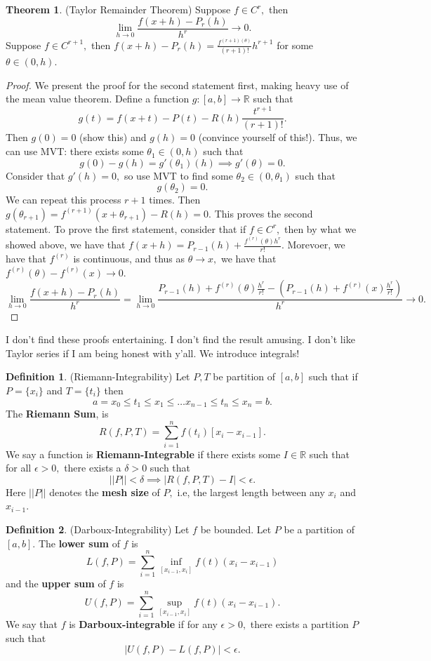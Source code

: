 \documentclass[10pt, oneside]{article}
\newcommand{\bbR}{\mathbb{R}}
\theoremstyle{definition}
\newtheorem{thm}{Theorem}
\newtheorem{defn}{Definition}
\begin{document}
\begin{thm}
    (Taylor Remainder Theorem) Suppose $f\in C^{r},$ then 
    \[\lim_{h\to 0}\frac{f(x + h) - P_r(h)}{h^r}\to 0.\] Suppose $f\in C^{r+1},$ then $f(x + h) - P_r(h) = \frac{f^{(r+1)(\theta)}}{(r+1)!}h^{r+1}$ for some $\theta \in (0,h).$
\end{thm}
\begin{proof}
    We present the proof for the second statement first, making heavy use of the mean value theorem. Define a function $g: [a,b]\to \bbR$ such that 
    \[g(t) = f(x + t) - P(t) - R(h)\frac{t^{r+1}}{(r+1)!}.\] Then $g(0) = 0$ (show this) and $g(h) = 0$ (convince yourself of this!). Thus, we can use MVT: there exists some $\theta_1 \in (0,h)$ such that
    \[g(0) - g(h) = g'(\theta_1)(h) \implies g'(\theta) = 0.\]
    Consider that $g'(h) = 0,$ so use MVT to find some $\theta_2 \in (0, \theta_1)$ such that 
    \[g(\theta_2) = 0.\] We can repeat this process $r+1$ times. Then $g(\theta_{r+1}) = f^{(r+1)}(x+\theta_{r+1}) - R(h) = 0.$ This proves the second statement. To prove the first statement, consider that if $f\in C^r,$ then by what we showed above, we have that $f(x+h) = P_{r-1}(h) + \frac{f^{(r)}(\theta) h^r}{r!}.$ Morevoer, we have that $f^{(r)}$ is continuous, and thus as $\theta \to x,$ we have that $f^{(r)}(\theta) - f^{(r)}(x)\to 0.$ 
    \[
    \lim_{h\to 0}\frac{f(x +h) - P_r(h)}{h^r} = \lim_{h\to 0}\frac{P_{r-1}(h) + f^{(r)}(\theta)\frac{h^r}{r!} - (P_{r-1}(h) + f^{(r)}(x)\frac{h^r}{r!})}{h^r} \to 0.
    \]
\end{proof}
I don't find these proofs entertaining. I don't find the result amusing. I don't like Taylor series if I am being honest with y'all. We introduce integrals!
\begin{defn}
    (Riemann-Integrability) Let $P,T$ be partition of $[a,b]$ such that if $P = \{x_i\}$ and $T = \{t_i\}$ then 
    \[a = x_0 \leq t_1 \leq x_1 \leq \dots x_{n-1} \leq t_n \leq x_n = b.\] The \textbf{Riemann Sum}, is 
    \[R(f, P, T) = \sum_{i=1}^n f(t_i)[x_i - x_{i-1}].\] We say a function is \textbf{Riemann-Integrable} if there exists some $I \in \bbR$ such that for all $\epsilon>0,$ there exists a $\delta>0$ such that 
    \[||P||< \delta \implies |R(f, P, T) - I|< \epsilon.\] Here $||P||$ denotes the \textbf{mesh size} of $P,$ i.e, the largest length between any $x_i$ and $x_{i-1}.$
\end{defn}
\begin{defn}
    (Darboux-Integrability) Let $f$ be bounded. Let $P$ be a partition of $[a,b].$ The \textbf{lower sum} of $f$ is 
    \[L(f,P) = \sum_{i=1}^n \inf_{[x_{i-1}, x_i]}f(t)(x_i - x_{i-1})\] and the \textbf{upper sum} of $f$ is 
    \[U(f,P) = \sum_{i=1}^n \sup_{[x_{i-1}, x_i]}f(t)(x_i - x_{i-1}).\] We say that $f$ is \textbf{Darboux-integrable} if for any $\epsilon>0,$ there exists a partition $P$ such that 
    \[|U(f,P) - L(f,P)|< \epsilon.\]
\end{defn}
\end{document}
